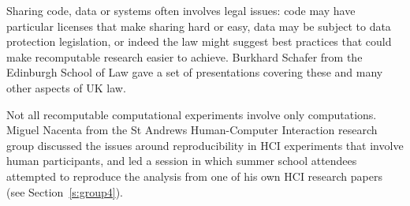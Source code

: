 Sharing code, data or systems often involves legal issues: code
may have particular licenses that make sharing hard or easy, data may
be subject to data protection legislation, or indeed the law might
suggest best practices that could make recomputable research easier to
achieve.  Burkhard Schafer from the Edinburgh School of Law gave a set
of presentations covering these and many other aspects of UK law.

Not all recomputable computational experiments involve only
computations. Miguel Nacenta from the St Andrews Human-Computer
Interaction research group discussed the issues around
reproducibility in HCI experiments that involve human participants,
and led a session in which summer school attendees attempted to
reproduce the analysis from one of his own HCI research papers (see
    Section~\ref{s:group4}).
